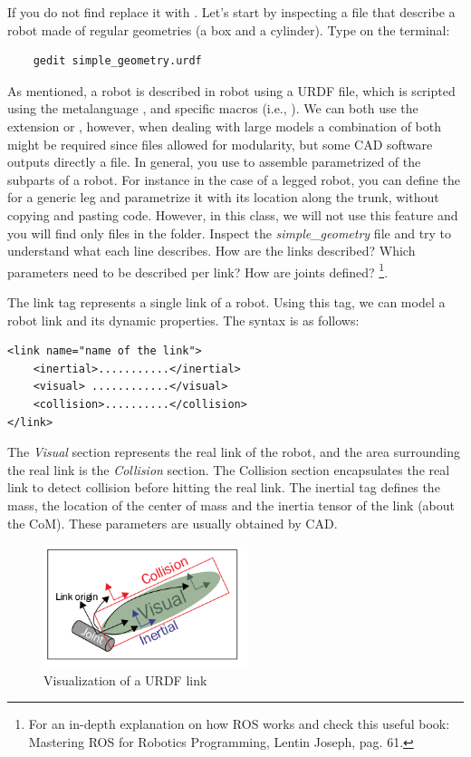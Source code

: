 \documentclass[11pt]{article}
\begin{document}
 If you do not find \codeword{~} replace it with .
Let's start by inspecting a file that describe a robot made of regular geometries (a box and a cylinder). Type on the terminal:

\begin{verbatim}
	gedit simple_geometry.urdf
\end{verbatim}

As mentioned, a robot is described in robot using a URDF file, which is scripted using the metalanguage , and specific  macros (i.e., ). We can both use the extension  or , however, when dealing with large models a combination of both might be required since  files allowed for modularity, but some CAD software outputs directly a  file. In general, you use   to assemble  parametrized   of the subparts of a robot. For instance in the case of a legged robot, you can define the   for a generic leg and parametrize it with its location along the trunk, without copying and pasting code. However, in this class, we will not use this feature and you will find only  files in the folder. 
Inspect the \textit{simple\_geometry} file and try to understand what each line describes. How are the links described? Which parameters need to be described per link? How are joints defined? \footnote{For an in-depth explanation on how ROS works and check this useful book: Mastering ROS for Robotics	Programming, Lentin Joseph, pag. 61.}. 

The link tag represents a single link of a robot. Using this tag, we
can model a robot link and its dynamic properties. The syntax is as follows:
	
\begin{Verbatim}	
<link name="name of the link">
	<inertial>...........</inertial>
	<visual> ............</visual>
	<collision>..........</collision>
</link>
\end{Verbatim}

The \textit{Visual} section represents the real link of the robot, and the area surrounding the real link
is the \textit{Collision} section. The Collision section encapsulates the real link to
detect collision before hitting the real link. The inertial tag defines the mass, the location of the center of mass and the inertia tensor of the link (about the CoM). These parameters are usually obtained by CAD.

\begin{figure}[H]
	\centering
	\includegraphics[width=6cm]{pics/link.png}
	\caption{Visualization of a URDF link}
	\label{fig:link}
\end{figure}
\end{document}
